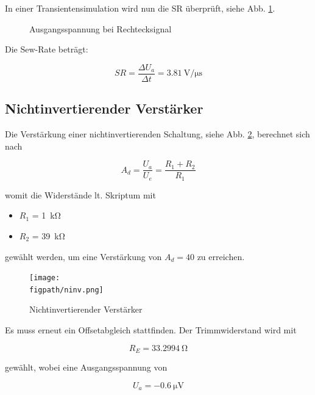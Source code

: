 In einer Transientensimulation wird nun die SR überprüft, siehe Abb. \ref{fig_Kap5_21:SR}.

\begin{figure}[H]
	\centering \small
	\scalebox{0.9}{}
	\caption{Ausgangsspannung bei Rechtecksignal}
	\label{fig_Kap5_21:SR}
\end{figure}

Die Sew-Rate beträgt:

\begin{equation}
    SR = \frac{\Delta U_a}{\Delta t} = \SI{3.81}{\volt\per\micro\second}
\end{equation}

\subsection{Nichtinvertierender Verstärker}
Die Verstärkung einer nichtinvertierenden Schaltung, siehe Abb. \ref{fig_Kap5_22:ESB}, berechnet sich nach

\begin{equation}
    A_d = \frac{U_a}{U_e} = \frac{R_1+R_2}{R_1}
\end{equation}

womit die Widerstände lt. Skriptum mit

\begin{itemize}
    \item $R_1$ = \SI{1}{\kilo\ohm}
    \item $R_2$ = \SI{39}{\kilo\ohm}
\end{itemize}

gewählt werden, um eine Verstärkung von $A_d = 40$ zu erreichen.

\begin{figure}[H]
    \centering
    \texttt{[image: \\figpath/ninv.png]}
    \caption{Nichtinvertierender Verstärker}
    \label{fig_Kap5_22:ESB}
\end{figure}

Es muss erneut ein Offsetabgleich stattfinden. Der Trimmwiderstand wird mit 

\begin{equation*}
    R_E = \SI{33.2994}{\ohm}
\end{equation*}

gewählt, wobei eine Ausgangsspannung von

\begin{equation*}
    U_a = -\SI{0,6}{\micro\volt}
\end{equation*}

